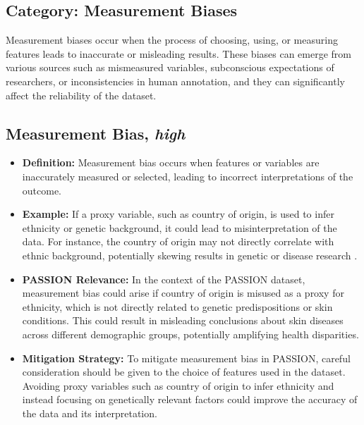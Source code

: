 \begin{refsection}
		
		
		
		
		\section{\textbf{Category:} Measurement Biases}
		Measurement biases occur when the process of choosing, using, or measuring features leads to inaccurate or misleading results. These biases can emerge from various sources such as mismeasured variables, subconscious expectations of researchers, or inconsistencies in human annotation, and they can significantly affect the reliability of the dataset.
		
		\subsection{Measurement Bias, \textit{high}}
		\begin{itemize}
			\item \textbf{Definition:} Measurement bias occurs when features or variables are inaccurately measured or selected, leading to incorrect interpretations of the outcome.
			\item \textbf{Example:} If a proxy variable, such as country of origin, is used to infer ethnicity or genetic background, it could lead to misinterpretation of the data. For instance, the country of origin may not directly correlate with ethnic background, potentially skewing results in genetic or disease research \autocite{Mehrabi_2021}.
			\item \textbf{PASSION Relevance:} In the context of the PASSION dataset, measurement bias could arise if country of origin is misused as a proxy for ethnicity, which is not directly related to genetic predispositions or skin conditions. This could result in misleading conclusions about skin diseases across different demographic groups, potentially amplifying health disparities.
			\item \textbf{Mitigation Strategy:} To mitigate measurement bias in PASSION, careful consideration should be given to the choice of features used in the dataset. Avoiding proxy variables such as country of origin to infer ethnicity and instead focusing on genetically relevant factors could improve the accuracy of the data and its interpretation.
		\end{itemize}
		

\end{refsection}
